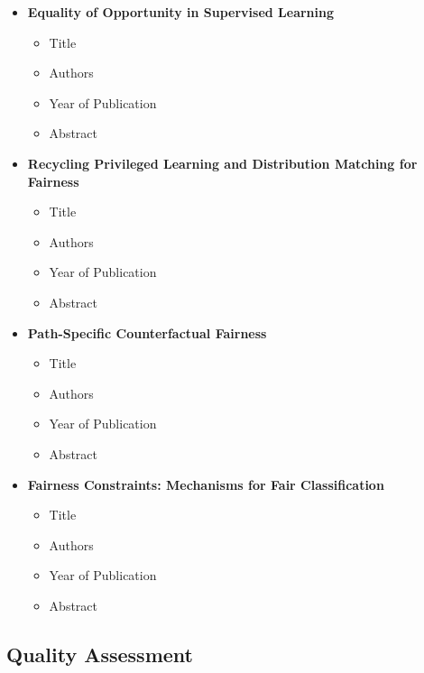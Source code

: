 \documentclass{article}
\begin{document}
\begin{itemize}
\begin{itemize}
        \item \textbf{Equality of Opportunity in Supervised Learning}
        \begin{itemize}
            \item Title
            \item Authors
            \item Year of Publication
            \item Abstract
        \end{itemize}
        
        \item \textbf{Recycling Privileged Learning and Distribution Matching for Fairness}
        \begin{itemize}
            \item Title
            \item Authors
            \item Year of Publication
            \item Abstract
        \end{itemize}
        
        \item \textbf{Path-Specific Counterfactual Fairness}
        \begin{itemize}
            \item Title
            \item Authors
            \item Year of Publication
            \item Abstract
        \end{itemize}
        
        \item \textbf{Fairness Constraints: Mechanisms for Fair Classification}
        \begin{itemize}
            \item Title
            \item Authors
            \item Year of Publication
            \item Abstract
        \end{itemize}
    \end{itemize}

    \subsection{Quality Assessment}


\end{itemize}
\end{document}
